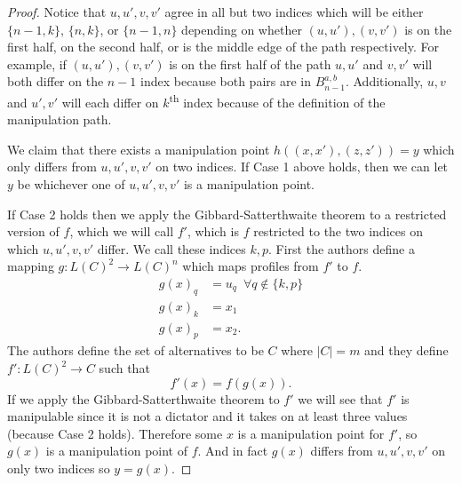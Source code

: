 \begin{proof}
		Notice that $u, u', v, v'$ agree in all but two indices which will be either $\{n - 1, k\}$, $\{n, k\}$, or $\{n - 1, n\}$ depending on whether $(u, u'), (v, v')$ is on the first half, on the second half, or is the middle edge of the path respectively. For example, if $(u, u'), (v, v')$ is on the first half of the path $u, u'$ and $v, v'$ will both differ on the $n - 1$ index because both pairs are in $B^{a,b}_{n-1}$. Additionally, $u, v$ and $u', v'$ will each differ on $k$\textsuperscript{th} index because of the definition of the manipulation path.

		We claim that there exists a manipulation point $h((x, x'), (z, z')) = y$ which only differs from $u, u', v, v'$ on two indices. If Case 1 above holds, then we can let $y$ be whichever one of $u, u', v, v'$ is a manipulation point.

		If Case 2 holds then we apply the Gibbard-Satterthwaite theorem to a restricted version of $f$, which we will call $f'$, which is $f$ restricted to the two indices on which $u, u', v, v'$ differ. We call these indices $k, p$. First the authors define a mapping $g : L(C)^2 \rightarrow L(C)^n$ which maps profiles from $f'$ to $f$.
		\begin{align*}
			g(x)_q &= u_q \,\,\, \forall q \notin \{k, p\} \\
			g(x)_k &= x_1 \\
			g(x)_p &= x_2.
		\end{align*}
		The authors define the set of alternatives to be $C$ where $|C| = m$ and they define $f' : L(C)^2 \rightarrow C$ such that
		\[
			f'(x) = f(g(x)).
		\]
		If we apply the Gibbard-Satterthwaite theorem \cite{gibbard1973manipulation, satterthwaite1975strategy} to $f'$ we will see that $f'$ is manipulable since it is not a dictator and it takes on at least three values (because Case 2 holds). Therefore some $x$ is a manipulation point for $f'$, so $g(x)$ is a manipulation point of $f$. And in fact $g(x)$ differs from $u, u', v, v'$ on only two indices so $y = g(x)$.


\end{proof}
